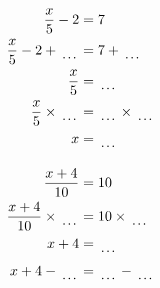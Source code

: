 \documentclass[12pt]{article}
\newcounter{minipagecount}
\begin{document}
\begin{multicols}{2}
\begin{minipage}[t]{0.45\textwidth}
    \raggedright %
    \begin{align*} %
        \frac{x}{5} - 2 &= 7\\
        \frac{x}{5} - 2 + \dotuline{\hspace{5mm}} &= 7 + \dotuline{\hspace{5mm}}\\
        \frac{x}{5} &= \dotuline{\hspace{5mm}}\\
        \frac{x}{5} \times\dotuline{\hspace{5mm}} &= \dotuline{\hspace{5mm}} \times\dotuline{\hspace{5mm}}\\
        x &= \dotuline{\hspace{5mm}}\\
    \end{align*}
\end{minipage} %
\noindent{(\theminipagecount)}\hspace{0.1mm} %
\begin{minipage}[t]{0.45\textwidth} %
    \vspace{-26pt}  %
    \raggedright %
    \begin{align*} %
        \frac{x + 4}{10} &= 10\\
        \frac{x + 4}{10} \times\dotuline{\hspace{5mm}} &= 10 \times\dotuline{\hspace{5mm}}\\
        x + 4 &= \dotuline{\hspace{5mm}}\\
        x + 4 - \dotuline{\hspace{5mm}} &= \dotuline{\hspace{5mm}} - \dotuline{\hspace{5mm}}\\

\end{align*}
\end{minipage}
\end{multicols}
\end{document}
